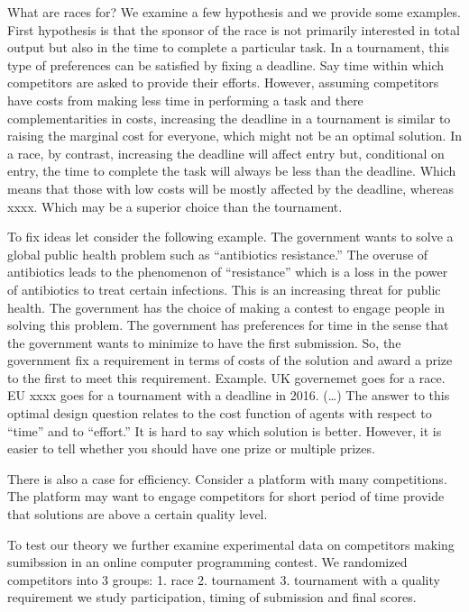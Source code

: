 \documentclass[12pt, titlepage, draft]{article} \usepackage[utf8]{inputenc}                           \usepackage[english]{babel}                           \usepackage{amsmath,amssymb,amsfonts}                 \usepackage{xcolor,tikz,graphicx,subfig}              \usepackage{rotating,multirow,array,dcolumn,booktabs} \usepackage{natbib}                                   
\begin{document}
What are races for? We examine a few hypothesis and we provide some
examples. First hypothesis is that the sponsor of the race is not
primarily interested in total output but also in the time to complete a
particular task. In a tournament, this type of preferences can be
satisfied by fixing a deadline. Say time within which competitors are
asked to provide their efforts. However, assuming competitors have costs
from making less time in performing a task and there complementarities
in costs, increasing the deadline in a tournament is similar to raising
the marginal cost for everyone, which might not be an optimal solution.
In a race, by contrast, increasing the deadline will affect entry but,
conditional on entry, the time to complete the task will always be less
than the deadline. Which means that those with low costs will be mostly
affected by the deadline, whereas xxxx. Which may be a superior choice
than the tournament.

To fix ideas let consider the following example. The government wants to
solve a global public health problem such as ``antibiotics resistance.''
The overuse of antibiotics leads to the phenomenon of ``resistance''
which is a loss in the power of antibiotics to treat certain infections.
This is an increasing threat for public health. The government has the
choice of making a contest to engage people in solving this problem. The
government has preferences for time in the sense that the government
wants to minimize to have the first submission. So, the government fix a
requirement in terms of costs of the solution and award a prize to the
first to meet this requirement. Example. UK governemet goes for a race.
EU xxxx goes for a tournament with a deadline in 2016. (\ldots{}) The
answer to this optimal design question relates to the cost function of
agents with respect to ``time'' and to ``effort.'' It is hard to say
which solution is better. However, it is easier to tell whether you
should have one prize or multiple prizes.

There is also a case for efficiency. Consider a platform with many
competitions. The platform may want to engage competitors for short
period of time provide that solutions are above a certain quality level.

To test our theory we further examine experimental data on competitors
making sumibssion in an online computer programming contest. We
randomized competitors into 3 groups: 1. race 2. tournament 3.
tournament with a quality requirement we study participation, timing of
submission and final scores.
\end{document}
